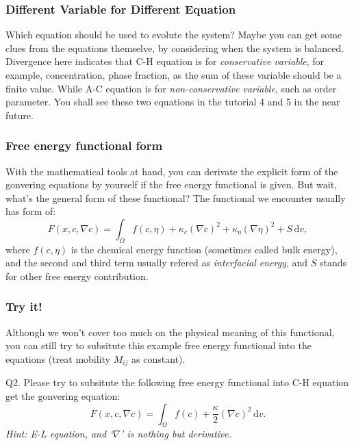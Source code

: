 \documentclass[compress]{beamer}
\begin{document}
\begin{frame}
  \frametitle{Different Variable for Different Equation}
  Which equation should be used to evolute the system? Maybe you can get some clues from the equations themselve, by considering
  when the system is balanced. Divergence here indicates that C-H equation is for \emph{conservative variable}, for example,
  concentration, phase fraction, as the sum of these variable should be a finite value. While A-C equation is for \emph{non-conservative
    variable}, such as order parameter. You shall see these two equations in the tutorial 4 and 5 in the near future.
\end{frame}

\begin{frame}
  \frametitle{Free energy functional form}
  With the mathematical tools at hand, you can derivate the explicit form of the gonvering equations by yourself if
  the free energy functional is given. But wait, what's the general form of these functional?
  \bigbreak
  The functional we encounter usually has form of:
  \[F(x,c,\nabla c) = \int_{\Omega} f(c,\eta) + \kappa_c
    \left( \nabla{c} \right)^2 +\kappa_\eta\left( \nabla{\eta} \right)^2 + S\,\mathrm{d}v,\]
  where \(f(c,\eta)\) is the chemical energy function (sometimes called bulk energy), and the second and third term usually
  refered as \emph{interfacial energy}, and \(S\) stands for other free energy contribution.
\end{frame}

\begin{frame}
  \frametitle{Try it!}
  Although we won't cover too much on the physical meaning of this functional, you can still try to subsitute this example
  free energy functional into the equations (treat mobility \(M_{ij}\) as constant).
  \bigbreak
  \begin{block}{Q2.}
    Please try to subsitute the following free energy functional into C-H equation get the gonvering equation:
    \[F\left( x,c,\nabla c \right) = \int_{\Omega} f(c) + \frac{\kappa}{2}\left( \nabla c \right)^2 \,\mathrm{d}v.\]
    \bigbreak
    \emph{Hint: E-L equation, and `\(\nabla\)' is nothing but derivative.}
  \end{block}
\end{frame}
\end{document}
